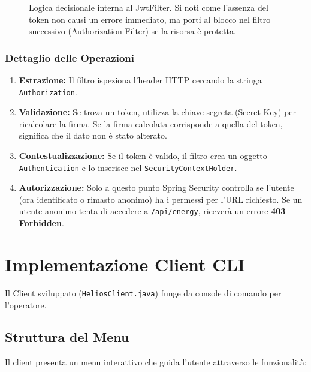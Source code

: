 \documentclass[a4paper,12pt]{report}
\begin{document}
\begin{figure}[H]
{
    }
    \caption{Logica decisionale interna al JwtFilter. Si noti come l'assenza del token non causi un errore immediato, ma porti al blocco nel filtro successivo (Authorization Filter) se la risorsa è protetta.}
    \label{fig:security_chain_detail}
\end{figure}

\subsection{Dettaglio delle Operazioni}
\begin{enumerate}
    \item \textbf{Estrazione:} Il filtro ispeziona l'header HTTP cercando la stringa \texttt{Authorization}.
    \item \textbf{Validazione:} Se trova un token, utilizza la chiave segreta (Secret Key) per ricalcolare la firma. Se la firma calcolata corrisponde a quella del token, significa che il dato non è stato alterato.
    \item \textbf{Contestualizzazione:} Se il token è valido, il filtro crea un oggetto \texttt{Authentication} e lo inserisce nel \texttt{SecurityContextHolder}. 
    \item \textbf{Autorizzazione:} Solo a questo punto Spring Security controlla se l'utente (ora identificato o rimasto anonimo) ha i permessi per l'URL richiesto. Se un utente anonimo tenta di accedere a \texttt{/api/energy}, riceverà un errore \textbf{403 Forbidden}.
\end{enumerate}
\chapter{Implementazione Client CLI}

Il Client sviluppato (\texttt{HeliosClient.java}) funge da console di comando per l'operatore.

\section{Struttura del Menu}
Il client presenta un menu interattivo che guida l'utente attraverso le funzionalità:
\end{document}
